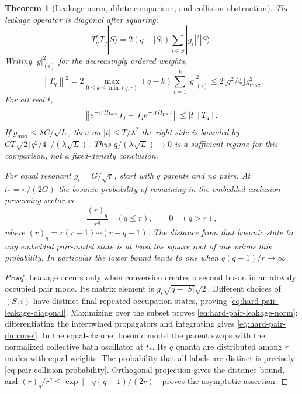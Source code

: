 \documentclass[11pt,a4paper,oneside]{book}
\theoremstyle{plain}
\newtheorem{theorem}{Theorem}[chapter]
\theoremstyle{definition}
\theoremstyle{remark}
\newcommand{\ii}{\mathrm i}
\newcommand{\norm}[1]{\left\lVert#1\right\rVert}
\newcommand{\src}[2]{\cite{#1}}
\begin{document}
\begin{theorem}[Leakage norm, dilute comparison, and collision obstruction]
\label{thm:hard-pair-leakage}
The leakage operator is diagonal after squaring:
\begin{equation}
 T_q^*T_q|S\rangle
 =2(q-|S|)\sum_{i\in S}|g_i|^2|S\rangle.
 \label{eq:hard-pair-leakage-diagonal}
\end{equation}
Writing $|g|_{(i)}^2$ for the decreasingly ordered weights,
\begin{equation}
 \norm{T_q}^2=2\max_{0\le k\le\min(q,r)}
       (q-k)\sum_{i=1}^k|g|_{(i)}^2
 \le2\lfloor q^2/4\rfloor g_{\max}^2.
 \label{eq:hard-pair-leakage-norm}
\end{equation}
For all real $t$,
\begin{equation}
 \norm{e^{-\ii tH_{\rm bos}}J_q-J_qe^{-\ii tH_{\rm pair}}}
 \le |t|\norm{T_q}.
 \label{eq:hard-pair-duhamel}
\end{equation}
If $g_{\max}\le\lambda C/\sqrt L$, then on
$|t|\le T/\lambda^2$ the right side is bounded by
$CT\sqrt{2\lfloor q^2/4\rfloor}/(\lambda\sqrt L)$.
Thus $q/(\lambda\sqrt L)\to0$ is a sufficient regime for this
comparison, not a fixed-density conclusion.

For equal resonant $g_i=G/\sqrt r$, start with $q$ parents and no pairs.
At $t_* =\pi/(2G)$ the bosonic probability of remaining in the embedded
exclusion-preserving sector is
\begin{equation}
 \frac{(r)_q}{r^q}\quad(q\le r),\qquad 0\quad(q>r),
 \label{eq:pair-collision-probability}
\end{equation}
where $(r)_q=r(r-1)\cdots(r-q+1)$.  The distance from that bosonic state
to any embedded pair-model state is at least the square root of one
minus this probability.  In particular the lower bound tends to one
when $q(q-1)/r\to\infty$.
\end{theorem}
\begin{proof}
Leakage occurs only when conversion creates a second boson in an
already occupied pair mode.  Its matrix element is
$g_i\sqrt{q-|S|}\sqrt2$.  Different choices of $(S,i)$ have distinct
final repeated-occupation states, proving
\eqref{eq:hard-pair-leakage-diagonal}.  Maximizing over the subset
proves \eqref{eq:hard-pair-leakage-norm}; differentiating the
intertwined propagators and integrating gives
\eqref{eq:hard-pair-duhamel}.  In the equal-channel bosonic model the
parent swaps with the normalized collective bath oscillator at $t_*$.
Its $q$ quanta are distributed among $r$ modes with equal weights.
The probability that all labels are distinct is precisely
\eqref{eq:pair-collision-probability}.  Orthogonal projection gives
the distance bound, and
$(r)_q/r^q\le\exp[-q(q-1)/(2r)]$ proves the asymptotic assertion.
\end{proof}
\src{R20}{thm:v20v58-leakage,cor:v20v58-scaling,thm:v20v58-collision}
\end{document}
